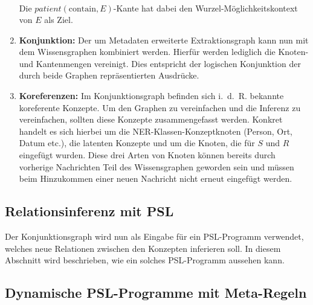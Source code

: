\begin{enumerate}
\begin{align*}
		\end{align*}
		Die $patient(\text{contain}, E)$-Kante hat dabei den Wurzel-Möglichkeitskontext von $E$ als Ziel.
	\item \textbf{Konjunktion:}
		Der um Metadaten erweiterte Extraktionsgraph kann nun mit dem Wissensgraphen kombiniert werden.
		Hierfür werden lediglich die Knoten- und Kantenmengen vereinigt.
		Dies entspricht der logischen Konjunktion der durch beide Graphen repräsentierten Ausdrücke.
	\item \textbf{Koreferenzen:}
		Im Konjunktionsgraph befinden sich i.~d.~R. bekannte koreferente Konzepte.
		Um den Graphen zu vereinfachen und die Inferenz zu vereinfachen, sollten diese Konzepte zusammengefasst werden.
		Konkret handelt es sich hierbei um die NER-Klassen-Konzeptknoten (Person, Ort, Datum etc.), die latenten Konzepte und um die Knoten, die für $S$ und $R$ eingefügt wurden.
		Diese drei Arten von Knoten können bereits durch vorherige Nachrichten Teil des Wissensgraphen geworden sein und müssen beim Hinzukommen einer neuen Nachricht nicht erneut eingefügt werden.
\end{enumerate}

\subsection{Relationsinferenz mit PSL}%
\label{sec:text2kg:psl:inference}

Der Konjunktionsgraph wird nun als Eingabe für ein PSL-Programm verwendet, welches neue Relationen zwischen den Konzepten inferieren soll.
In diesem Abschnitt wird beschrieben, wie ein solches PSL-Programm aussehen kann.

\subsection{Dynamische PSL-Programme mit Meta-Regeln}%
\label{sec:text2kg:psl:meta}
